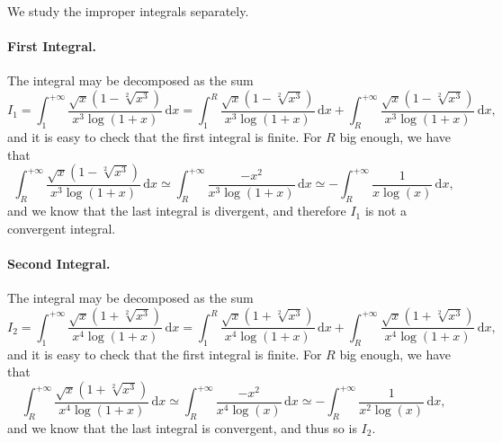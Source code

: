 \documentclass[a4paper,10 pt]{report}
\theoremstyle{definition}
\begin{document}
\begin{solutionBox} We study the improper integrals separately.

\paragraph{First Integral.} The integral may be decomposed as the sum
\begin{equation*}I_1 = \int_1^{+ \infty} \frac{ \sqrt{x}(1 - \sqrt[2]{x^3})}{x^3 \log(1 + x)} \, \mathrm{d}x = \int_1^R \frac{ \sqrt{x}(1 - \sqrt[2]{x^3})}{x^3 \log(1 + x)} \, \mathrm{d}x + \int_R^{+ \infty} \frac{ \sqrt{x}(1 - \sqrt[2]{x^3})}{x^3 \log(1 + x)} \, \mathrm{d}x , \end{equation*} 
and it is easy to check that the first integral is finite. For $R$ big enough, we have that
\begin{equation*} \int_R^{+ \infty} \frac{ \sqrt{x}(1 - \sqrt[2]{x^3})}{x^3 \log(1 + x)} \, \mathrm{d}x \simeq \int_R^{+ \infty} \frac{- x^2}{x^3 \log(1 + x)} \, \mathrm{d}x \simeq - \int_R^{+ \infty} \frac{1}{x \log(x)} \, \mathrm{d}x, \end{equation*} 
and we know that the last integral is divergent, and therefore $I_1$ is not a convergent integral.

\paragraph{Second Integral.} The integral may be decomposed as the sum
\begin{equation*}I_2 = \int_1^{+ \infty} \frac{ \sqrt{x}(1 + \sqrt[2]{x^3})}{x^4 \log(1 + x)} \, \mathrm{d}x = \int_1^R \frac{ \sqrt{x}(1 + \sqrt[2]{x^3})}{x^4 \log(1 + x)} \, \mathrm{d}x + \int_R^{+ \infty} \frac{ \sqrt{x}(1 + \sqrt[2]{x^3})}{x^4 \log(1 + x)} \, \mathrm{d}x, \end{equation*} 
and it is easy to check that the first integral is finite. For $R$ big enough, we have that
\begin{equation*} \int_R^{+ \infty} \frac{ \sqrt{x}(1 + \sqrt[2]{x^3})}{x^4 \log(1 + x)} \, \mathrm{d}x \simeq \int_R^{+ \infty} \frac{- x^2}{x^4 \log(x)} \, \mathrm{d}x \simeq - \int_R^{+ \infty} \frac{1}{x^2 \log(x)} \, \mathrm{d}x, \end{equation*} 
and we know that the last integral is convergent, and thus so is $I_2$.


\end{solutionBox}
\end{document}
